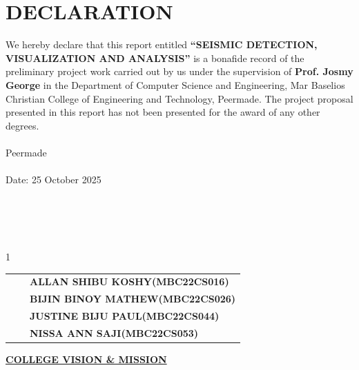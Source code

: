 \documentclass[a4paper,12pt]{report}
\begin{document}




\vspace{2cm}

\chapter*{DECLARATION}
\vspace{1cm}

\fontsize{12pt}{18pt}\selectfont
We hereby declare that this report entitled \textbf{\enquote {SEISMIC DETECTION, VISUALIZATION AND ANALYSIS}} is a bonafide record of the preliminary project work carried out by us under the supervision of \textbf{Prof. Josmy George} in the Department of Computer Science and Engineering, Mar Baselios Christian College of Engineering and Technology, Peermade. The project proposal presented in this report has not been presented for the award of any other degrees.\\
\\
Peermade \\
\\
Date: 25 October 2025 \\
\\
\\
\\
\\
\begin{spacing}{1}
	
	\begin{table}[h!]
		\centering
		\begin{tabular}{p{0.5cm} p{6cm} p{10cm}}
\textbf{} && \textbf{ALLAN SHIBU KOSHY(MBC22CS016)} \\[0.3cm]
\textbf{} && \textbf{BIJIN BINOY MATHEW(MBC22CS026)} \\[0.3cm]
\textbf{} && \textbf{JUSTINE BIJU PAUL(MBC22CS044)} \\[0.3cm]
			\textbf{} && \textbf{NISSA ANN SAJI(MBC22CS053)} \\[0.3cm]
		\end{tabular}
	\end{table}
\end{spacing}
\newpage

\newpage
\begin{center}
    \textbf{\underline{COLLEGE VISION \& MISSION}}
\end{center}
\vspace{0.5cm}
\end{document}
